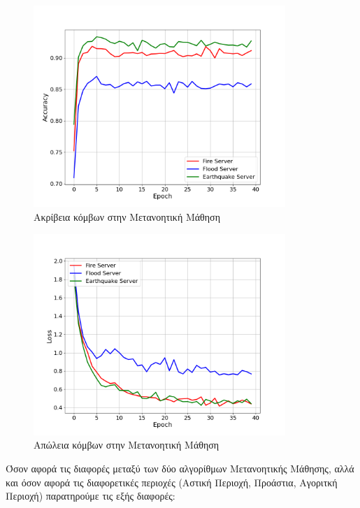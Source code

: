 \newpage

\begin{figure}[H]
    \centering
    \includegraphics[width=0.85\textwidth]{figures/chapter4/User_Accuracies.png}
    \caption{Ακρίβεια κόμβων στην Μετανοητική Μάθηση}
    \label{fig19}
\end{figure}

\begin{figure}[H]
    \centering
    \includegraphics[width=0.85\textwidth]{figures/chapter4/User_Losses.png}
    \caption{Απώλεια κόμβων στην Μετανοητική Μάθηση}
    \label{fig20}
\end{figure}

\newpage

Όσον αφορά τις διαφορές μεταξύ των δύο αλγορίθμων Μετανοητικής Μάθησης, αλλά και όσον αφορά τις διαφορετικές περιοχές (Αστική Περιοχή, Προάστια, Αγοριτκή Περιοχή) παρατηρούμε τις εξής διαφορές:

